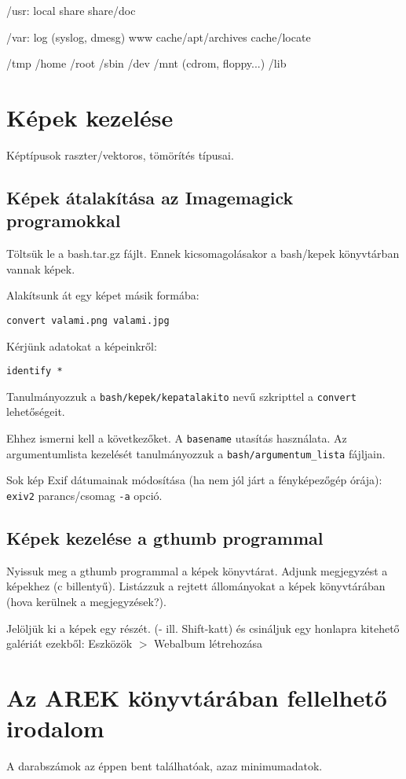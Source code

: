 \documentclass[a4paper]{article}
\newcommand{\code}{\texttt}
\newcommand{\dir}{\code}
\newcommand{\Ctrl}{\framebox{\texttt{Ctrl}}}
\begin{document}
/usr: local share share/doc

/var: log (syslog, dmesg) www cache/apt/archives cache/locate

/tmp /home /root /sbin /dev /mnt (cdrom, floppy...) /lib

\section{Képek kezelése}
Képtípusok raszter/vektoros, tömörítés típusai.

\subsection{Képek átalakítása az Imagemagick programokkal}

Töltsük le a bash.tar.gz fájlt. Ennek kicsomagolásakor a bash/kepek
könyvtárban vannak képek.

Alakítsunk át egy képet másik formába:
\begin{Verbatim}
convert valami.png valami.jpg
\end{Verbatim}

Kérjünk adatokat a képeinkről:
\begin{Verbatim}
identify *
\end{Verbatim}

Tanulmányozzuk a \code{bash/kepek/kepatalakito} nevű szkripttel a
\code{convert} lehetőségeit.

Ehhez ismerni kell a következőket.
A \code{basename} utasítás használata.
Az argumentumlista kezelését tanulmányozzuk a \dir{bash/argumentum\_lista} fájljain.

Sok kép Exif dátumainak módosítása (ha nem jól járt a fényképezőgép
órája): \code{exiv2} parancs/csomag \code{-a} opció.

\subsection{Képek kezelése a gthumb programmal}
Nyissuk meg a gthumb programmal a képek könyvtárat. Adjunk megjegyzést a
képekhez (c billentyű). Listázzuk a rejtett állományokat a képek
könyvtárában (hova kerülnek a megjegyzések?).

Jelöljük ki a képek egy részét. (\Ctrl- ill. Shift-katt) és csináljuk egy
honlapra kitehető galériát ezekből: Eszközök $>$ Webalbum létrehozása

\newpage
\appendix

\section{Az AREK könyvtárában fellelhető irodalom}
A darabszámok az éppen bent találhatóak, azaz minimumadatok.
\end{document}
